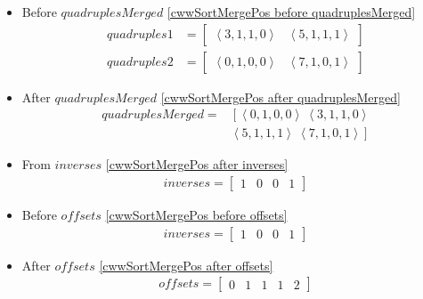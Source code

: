 \begin{frame}[containsverbatim]{\cwwalgortihmexampleframe}
\begin{columns}[c]
\begin{column}{0.65\textwidth}
\begin{multicols}{2}
\begin{itemize}
                            \item Before $quadruplesMerged$ \cref{cwwSortMergePos before quadruplesMerged}
                            \begin{align*}
                                quadruples1 & = \begin{bmatrix}\left<3, 1, 1, 0\right> & \left<5, 1, 1, 1\right>\end{bmatrix} \\
                                quadruples2 & = \begin{bmatrix}\left<0, 1, 0, 0\right> & \left<7, 1, 0, 1\right>\end{bmatrix}
                            \end{align*}

                            \item After $quadruplesMerged$ \cref{cwwSortMergePos after quadruplesMerged}
                            \begin{align*}
                                quadruplesMerged = & \left[\left<0, 1, 0, 0\right> \ \left<3, 1, 1, 0\right>\right. \\ 
                                & \left.\left<5, 1, 1, 1\right> \ \left<7, 1, 0, 1\right>\right]
                            \end{align*}

                            \item From $inverses$ \cref{cwwSortMergePos after inverses}
                            \begin{align*}
                                inverses = \begin{bmatrix}1 & 0 & 0 & 1\end{bmatrix}
                            \end{align*}

                            \item Before $offsets$ \cref{cwwSortMergePos before offsets}
                            \begin{align*}
                                inverses = \begin{bmatrix}1 & 0 & 0 & 1\end{bmatrix}
                            \end{align*}

                            \item After $offsets$ \cref{cwwSortMergePos after offsets}
                            \begin{align*}
                                offsets = \begin{bmatrix}0 & 1 & 1 & 1 & 2\end{bmatrix}
                            \end{align*}


\end{itemize}
\end{multicols}
\end{column}
\end{columns}
\end{frame}
